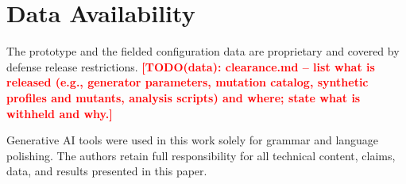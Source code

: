 \documentclass[sigconf,screen]{acmart}
\newcommand{\TODOdata}[1]{\textcolor{red}{\textbf{[TODO(data): #1]}}}
\begin{document}
\section*{Data Availability}
The prototype and the fielded configuration data are proprietary and covered by defense release restrictions. \TODOdata{clearance.md -- list what is released (e.g., generator parameters, mutation catalog, synthetic profiles and mutants, analysis scripts) and where; state what is withheld and why.}

\begin{acks}
Generative AI tools were used in this work solely for grammar and language polishing. The authors retain full responsibility for all technical content, claims, data, and results presented in this paper.
\end{acks}



\end{document}
